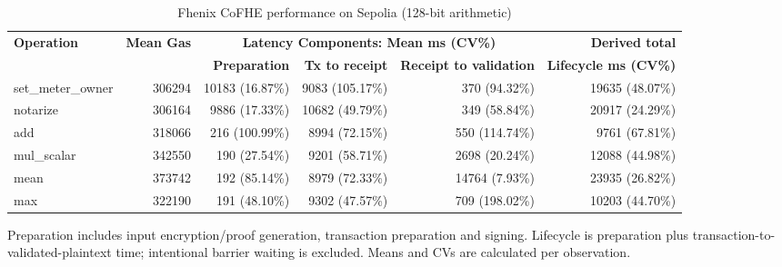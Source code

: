 \begin{table}[!t]
\caption{Fhenix CoFHE performance on Sepolia (128-bit arithmetic)}
\label{tab:fhenix-cofhe-sepolia-benchmark-128}
\centering
\scriptsize
\setlength{\tabcolsep}{4pt}
\begin{tabular}{|l|r|rrr|r|}
\hline
\textbf{Operation} &
\textbf{Mean Gas} &
\multicolumn{3}{c|}{\textbf{Latency Components: Mean ms (CV\%)}} &
\textbf{Derived total} \\
\cline{3-5}
& &
\textbf{Preparation} &
\textbf{Tx to receipt} &
\textbf{Receipt to validation} &
\textbf{Lifecycle ms (CV\%)} \\
\hline
set\_meter\_owner & 306294 & 10183 (16.87\%) & 9083 (105.17\%) & 370 (94.32\%) & 19635 (48.07\%) \\
notarize & 306164 & 9886 (17.33\%) & 10682 (49.79\%) & 349 (58.84\%) & 20917 (24.29\%) \\
add & 318066 & 216 (100.99\%) & 8994 (72.15\%) & 550 (114.74\%) & 9761 (67.81\%) \\
mul\_scalar & 342550 & 190 (27.54\%) & 9201 (58.71\%) & 2698 (20.24\%) & 12088 (44.98\%) \\
mean & 373742 & 192 (85.14\%) & 8979 (72.33\%) & 14764 (7.93\%) & 23935 (26.82\%) \\
max & 322190 & 191 (48.10\%) & 9302 (47.57\%) & 709 (198.02\%) & 10203 (44.70\%) \\
\hline
\end{tabular}
\vspace{2pt}
\parbox{\textwidth}{\scriptsize Preparation includes input encryption/proof generation, transaction preparation and signing. Lifecycle is preparation plus transaction-to-validated-plaintext time; intentional barrier waiting is excluded. Means and CVs are calculated per observation.}
\end{table}

